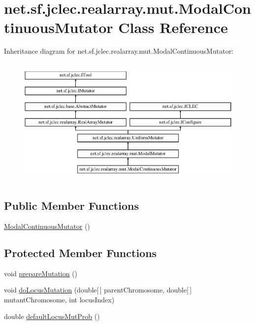 \hypertarget{classnet_1_1sf_1_1jclec_1_1realarray_1_1mut_1_1_modal_continuous_mutator}{\section{net.\-sf.\-jclec.\-realarray.\-mut.\-Modal\-Continuous\-Mutator Class Reference}
\label{classnet_1_1sf_1_1jclec_1_1realarray_1_1mut_1_1_modal_continuous_mutator}
}
Inheritance diagram for net.\-sf.\-jclec.\-realarray.\-mut.\-Modal\-Continuous\-Mutator\-:\begin{figure}[H]
\begin{center}
\leavevmode
\includegraphics[height=6.384365cm]{classnet_1_1sf_1_1jclec_1_1realarray_1_1mut_1_1_modal_continuous_mutator}
\end{center}
\end{figure}
\subsection*{Public Member Functions}
\begin{DoxyCompactItemize}
\item 
\hyperlink{classnet_1_1sf_1_1jclec_1_1realarray_1_1mut_1_1_modal_continuous_mutator_a86d3ba6c744ad36f87de79f0f5b32e4e}{Modal\-Continuous\-Mutator} ()
\end{DoxyCompactItemize}
\subsection*{Protected Member Functions}
\begin{DoxyCompactItemize}
\item 
void \hyperlink{classnet_1_1sf_1_1jclec_1_1realarray_1_1mut_1_1_modal_continuous_mutator_a7e418455e1ce51a13043d748d032a17d}{prepare\-Mutation} ()
\item 
void \hyperlink{classnet_1_1sf_1_1jclec_1_1realarray_1_1mut_1_1_modal_continuous_mutator_a6e076b47f18427a15106bb6da74222df}{do\-Locus\-Mutation} (double\mbox{[}$\,$\mbox{]} parent\-Chromosome, double\mbox{[}$\,$\mbox{]} mutant\-Chromosome, int locus\-Index)
\item 
double \hyperlink{classnet_1_1sf_1_1jclec_1_1realarray_1_1mut_1_1_modal_continuous_mutator_adaa4109160ccc186c9811f0ec8fab599}{default\-Locus\-Mut\-Prob} ()
\end{DoxyCompactItemize}
